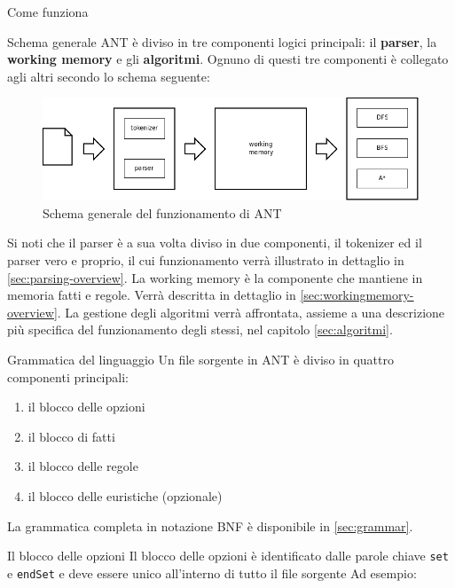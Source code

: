 \begin{chapter}{Come funziona}

\begin{section}{Schema generale}
ANT \`e diviso in tre componenti logici principali: il \textbf{parser}, la \textbf{
working memory} e gli \textbf{algoritmi}. Ognuno di questi tre componenti
\`e collegato agli altri secondo lo schema seguente:

\begin{figure}[!htb]
	\centering
	\includegraphics[scale=.45]{img/schemagenerale.png}
	\caption{Schema generale del funzionamento di ANT}
	\label{fig:schemagenerale}
\end{figure}

Si noti che il parser \`e a sua volta diviso in due componenti, il tokenizer
ed il parser vero e proprio, il cui funzionamento verr\`a illustrato in dettaglio
in \ref{sec:parsing-overview}.
La working memory \`e la componente che mantiene in memoria fatti e regole. Verr\`a
descritta in dettaglio in \ref{sec:workingmemory-overview}.
La gestione degli algoritmi verr\`a affrontata, assieme a una descrizione pi\`u
specifica del funzionamento degli stessi, nel capitolo \ref{sec:algoritmi}.

\end{section}

\begin{section}{Grammatica del linguaggio}
Un file sorgente in ANT \`e diviso in quattro componenti principali:
\begin{enumerate}
	\item il blocco delle opzioni
	\item il blocco di fatti
	\item il blocco delle regole
	\item il blocco delle euristiche (opzionale)
\end{enumerate}
\noindent La grammatica completa in notazione BNF \`e disponibile in \ref{sec:grammar}.

	\begin{subsection}{Il blocco delle opzioni}
	\label{sec:option-block}
	Il blocco delle opzioni \`e identificato dalle parole chiave \verb,set, e \verb,endSet, e deve
	essere unico all'interno di tutto il file sorgente
	Ad esempio:


\end{subsection}
\end{section}
\end{chapter}
